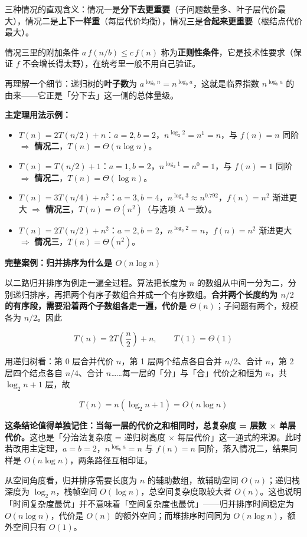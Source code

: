 \documentclass[11pt,openany,UTF8]{ctexbook}
\begin{document}
三种情况的直观含义：情况一是\textbf{分下去更重要}（子问题数量多、叶子层代价最大），情况二是\textbf{上下一样重}（每层代价均衡），情况三是\textbf{合起来更重要}（根结点代价最大）。

情况三里的附加条件 $a\,f(n/b)\le c\,f(n)$ 称为\textbf{正则性条件}，它是技术性要求（保证 $f$ 不会增长得太野），在统考里一般不用自己验证。

再理解一个细节：递归树的\textbf{叶子数}为 $a^{\log_b n}=n^{\log_b a}$，这就是临界指数 $n^{\log_b a}$ 的由来——它正是「分下去」这一侧的总体量级。

\textbf{主定理用法示例：}

\begin{itemize}
\item $T(n)=2T(n/2)+n$：$a=2,b=2$，$n^{\log_2 2}=n^1=n$，与 $f(n)=n$ 同阶 $\Rightarrow$ \textbf{情况二}，$T(n)=\Theta(n\log n)$。
\item $T(n)=T(n/2)+1$：$a=1,b=2$，$n^{\log_2 1}=n^0=1$，与 $f(n)=1$ 同阶 $\Rightarrow$ \textbf{情况二}，$T(n)=\Theta(\log n)$。
\item $T(n)=3T(n/4)+n^2$：$a=3,b=4$，$n^{\log_4 3}\approx n^{0.792}$，$f(n)=n^{2}$ 渐进更大 $\Rightarrow$ \textbf{情况三}，$T(n)=\Theta(n^2)$（与选项 A 一致）。
\item $T(n)=2T(n/2)+n^2$：$a=2,b=2$，$n^{\log_2 2}=n$，$f(n)=n^2$ 渐进更大 $\Rightarrow$ \textbf{情况三}，$T(n)=\Theta(n^2)$。
\end{itemize}
\textbf{完整案例：归并排序为什么是 $O(n\log n)$}

以二路归并排序为例走一遍全过程。算法把长度为 $n$ 的数组从中间一分为二，分别递归排序，再把两个有序子数组合并成一个有序数组。\textbf{合并两个长度约为 $n/2$ 的有序段，需要沿着两个子数组各走一遍，代价是 $\Theta(n)$}；子问题有两个，规模各为 $n/2$。因此

\[T(n)=2T\!\left(\frac{n}{2}\right)+n,\qquad T(1)=\Theta(1)\]

用递归树看：第 0 层合并代价 $n$，第 1 层两个结点各自合并 $n/2$、合计 $n$，第 2 层四个结点各自 $n/4$、合计 $n$……每一层的「分」与「合」代价之和恒为 $n$，共 $\log_2 n+1$ 层，故

\[T(n)=n(\log_2 n+1)=O(n\log n)\]

\textbf{这条结论值得单独记住：当每一层的代价之和相同时，总复杂度 = 层数 $\times$ 单层代价。}这也是「分治法复杂度 = 递归树高度 $\times$ 每层代价」这一通式的来源。此时若改用主定理，$a=b=2$，$n^{\log_b a}=n$ 与 $f(n)=n$ 同阶，落入情况二，结果同样是 $O(n\log n)$，两条路径互相印证。

从空间角度看，归并排序需要长度为 $n$ 的辅助数组，故辅助空间 $O(n)$；递归栈深度为 $\log_2 n$，栈帧空间 $O(\log n)$，总空间复杂度取较大者 $O(n)$。这也说明「时间复杂度最优」并不意味着「空间复杂度也最优」——归并排序时间稳定为 $O(n\log n)$，代价是 $O(n)$ 的额外空间；而堆排序时间同为 $O(n\log n)$，额外空间只有 $O(1)$。
\end{document}
